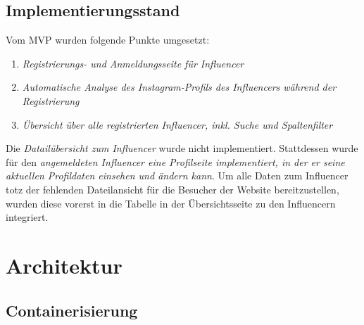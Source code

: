 \documentclass[conference,a4paper,flushend]{cs-techrep}
\begin{document}
\subsection{Implementierungsstand}
Vom MVP wurden folgende Punkte umgesetzt:
\begin{enumerate}
\item{\textit{Registrierungs- und Anmeldungsseite für Influencer}}
\item{\textit{Automatische Analyse des Instagram-Profils des Influencers während der Registrierung}}
\item{\textit{Übersicht über alle registrierten Influencer, inkl. Suche und Spaltenfilter}}
\end{enumerate}

Die \textit{Datailübersicht zum Influencer} wurde nicht implementiert. Stattdessen wurde für den \textit{angemeldeten Influencer eine Profilseite implementiert, in der er seine aktuellen Profildaten einsehen und ändern kann}. Um alle Daten zum Influencer totz der fehlenden Dateilansicht für die Besucher der Website bereitzustellen, wurden diese vorerst in die Tabelle in der Übersichtsseite zu den Influencern integriert. \\


\section{Architektur}

\subsection{Containerisierung}
\end{document}
